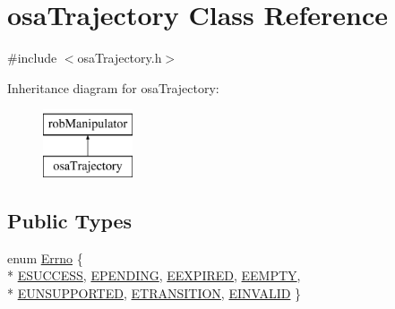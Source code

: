 \hypertarget{classosa_trajectory}{}\section{osa\+Trajectory Class Reference}
\label{classosa_trajectory}


{\ttfamily \#include $<$osa\+Trajectory.\+h$>$}

Inheritance diagram for osa\+Trajectory\+:\begin{figure}[H]
\begin{center}
\leavevmode
\includegraphics[height=2.000000cm]{d9/df1/classosa_trajectory}
\end{center}
\end{figure}
\subsection*{Public Types}
\begin{DoxyCompactItemize}
\item 
enum \hyperlink{classosa_trajectory_a9d6482436bb2b9a6c0513e2811ab79fc}{Errno} \{ \\*
\hyperlink{classosa_trajectory_a9d6482436bb2b9a6c0513e2811ab79fca3f4a62b11a8cddeaae5ae88117afddf8}{E\+S\+U\+C\+C\+E\+S\+S}, 
\hyperlink{classosa_trajectory_a9d6482436bb2b9a6c0513e2811ab79fcaa36d48a80aee1eb3e217e7195146b0cb}{E\+P\+E\+N\+D\+I\+N\+G}, 
\hyperlink{classosa_trajectory_a9d6482436bb2b9a6c0513e2811ab79fca7c6f299c4c65be5ac109d3c5b10ce9da}{E\+E\+X\+P\+I\+R\+E\+D}, 
\hyperlink{classosa_trajectory_a9d6482436bb2b9a6c0513e2811ab79fcae33391e7475ed0edfd26659e436e792a}{E\+E\+M\+P\+T\+Y}, 
\\*
\hyperlink{classosa_trajectory_a9d6482436bb2b9a6c0513e2811ab79fca04a63d5d5f5b993c63b12cf0a1f0ffdf}{E\+U\+N\+S\+U\+P\+P\+O\+R\+T\+E\+D}, 
\hyperlink{classosa_trajectory_a9d6482436bb2b9a6c0513e2811ab79fca563d9819010932267d5ad64b13fc5790}{E\+T\+R\+A\+N\+S\+I\+T\+I\+O\+N}, 
\hyperlink{classosa_trajectory_a9d6482436bb2b9a6c0513e2811ab79fca86ecf16dffea71f89b9c93c1e3a5fd58}{E\+I\+N\+V\+A\+L\+I\+D}
 \}
\end{DoxyCompactItemize}
